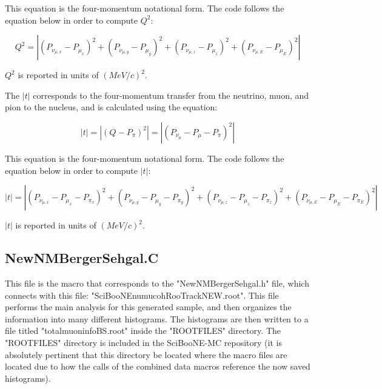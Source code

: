 \documentclass[11pt]{article}
\begin{document}
\noindent
This equation is the four-momentum notational form. The code follows the equation below in order to compute $Q^2$:

\begin{equation}
Q^2 = |(P_{\nu_{\mu,x}} - P_{\mu_x})^2 + (P_{\nu_{\mu,y}} - P_{\mu_y})^2 + (P_{\nu_{\mu,z}} - P_{\mu_z})^2 + (P_{\nu_{\mu,E}} - P_{\mu_E})^2|
\end{equation}

\noindent
$Q^2$ is reported in units of $(MeV/c)^2$.

The $|t|$ corresponds to the four-momentum transfer from the neutrino, muon, and pion to the nucleus, and is calculated using the equation:

\begin{equation}
|t| = |(Q - P_\pi)^2| = |(P_{\nu_\mu} - P_\mu - P_\pi)^2|
\end{equation}

\noindent
This equation is the four-momentum notational form. The code follows the equation below in order to compute $|t|$:

\begin{equation}
|t| = |(P_{\nu_{\mu,x}} - P_{\mu_x} - P_{\pi_x})^2 + (P_{\nu_{\mu,y}} - P_{\mu_y} - P_{\pi_y})^2 + (P_{\nu_{\mu,z}} - P_{\mu_z} - P_{\pi_z})^2 + (P_{\nu_{\mu,E}} - P_{\mu_E} - P_{\pi_E})^2|
\end{equation}

\noindent
$|t|$ is reported in units of $(MeV/c)^2$.

\subsection{NewNMBergerSehgal.C}
\label{sub:NewNMBergerSehgal.C}
This file is the macro that corresponds to the "NewNMBergerSehgal.h" file, which connects with this file: "SciBooNE\textunderscore numu\textunderscore coh\textunderscore RooTrack\textunderscore NEW.root". This file performs the main analysis for this generated sample, and then organizes the information into many different histograms. The histograms are then written to a file titled "totalmuoninfoBS.root" inside the "ROOTFILES" directory. The "ROOTFILES" directory is included in the SciBooNE-MC repository (it is absolutely pertinent that this directory be located where the macro files are located due to how the calls of the combined data macros reference the now saved histograms).
\end{document}
